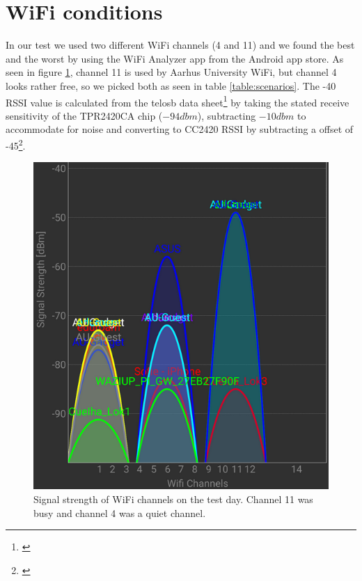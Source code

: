 \section{WiFi conditions}\label{sc:wifi}
In our test we used two different WiFi channels (4 and 11) and we found the best and the worst by using the WiFi Analyzer app from the Android app store\cite{Farproc@gmail.com2018}. As seen in figure \ref{fig:wifionthetestday}, channel 11 is used by Aarhus University WiFi, but channel 4 looks rather free, so we picked both as seen in table \ref{table:scenarios}. The -40 RSSI value is calculated from the telosb data sheet\footnote{\cite{CrossbowTechnologyInc.2004}} by taking the stated receive sensitivity of the TPR2420CA chip ($-94dbm$), subtracting $-10dbm$ to accommodate for noise and converting to CC2420 RSSI by subtracting a offset of -45\footnote{\cite{Ieee}}.

\begin{figure}[h]
	\centering
	\includegraphics[width=1\linewidth]{testAndPerformance/wifi/wifiOnTheTestDay}
	\caption{Signal strength of WiFi channels on the test day. Channel 11 was busy and channel 4 was a quiet channel.}
	\label{fig:wifionthetestday}
\end{figure}
